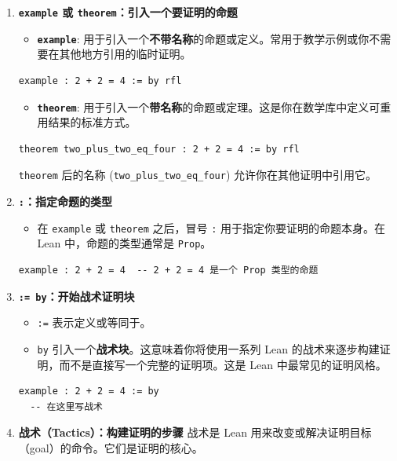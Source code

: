 \documentclass{amsart}
\theoremstyle{plain}
\theoremstyle{definition}
\theoremstyle{remark}
\begin{document}
\begin{enumerate}
	\item \textbf{\lstinline{example} 或 \lstinline{theorem}：引入一个要证明的命题}
	\begin{itemize}
		\item \textbf{\lstinline{example}}: 用于引入一个\textbf{不带名称}的命题或定义。常用于教学示例或你不需要在其他地方引用的临时证明。
	\end{itemize}
\begin{lstlisting}[language=lean]
example : 2 + 2 = 4 := by rfl
\end{lstlisting}	\begin{itemize}
		\item \textbf{\lstinline{theorem}}: 用于引入一个\textbf{带名称}的命题或定理。这是你在数学库中定义可重用结果的标准方式。
	\end{itemize}
\begin{lstlisting}[language=lean]
theorem two_plus_two_eq_four : 2 + 2 = 4 := by rfl
\end{lstlisting}\lstinline{theorem} 后的名称 (\lstinline{two_plus_two_eq_four}) 允许你在其他证明中引用它。
	\item \textbf{\lstinline{:}：指定命题的类型}
	\begin{itemize}
		\item 在 \lstinline{example} 或 \lstinline{theorem} 之后，冒号 \lstinline{:} 用于指定你要证明的命题本身。在 Lean 中，命题的类型通常是 \lstinline{Prop}。
	\end{itemize}
\begin{lstlisting}[language=lean]
example : 2 + 2 = 4  -- 2 + 2 = 4 是一个 Prop 类型的命题
\end{lstlisting}	\item \textbf{\lstinline{:= by}：开始战术证明块}
	\begin{itemize}
		\item \lstinline{:=} 表示定义或等同于。
		\item \lstinline{by} 引入一个\textbf{战术块}。这意味着你将使用一系列 Lean 的战术来逐步构建证明，而不是直接写一个完整的证明项。这是 Lean 中最常见的证明风格。
	\end{itemize}
\begin{lstlisting}[language=lean]
example : 2 + 2 = 4 := by
  -- 在这里写战术
\end{lstlisting}	\item \textbf{战术（Tactics）：构建证明的步骤}
战术是 Lean 用来改变或解决证明目标（goal）的命令。它们是证明的核心。
	\begin{itemize}

\end{itemize}
\end{enumerate}
\end{document}

